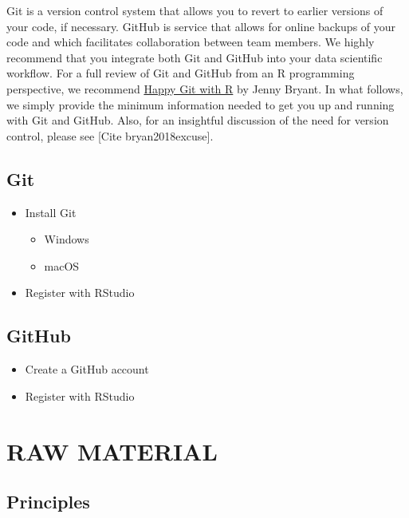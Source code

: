 \documentclass[
]{book}
\providecommand{\tightlist}{%
  \setlength{\itemsep}{0pt}\setlength{\parskip}{0pt}}
\begin{document}
Git is a version control system that allows you to revert to earlier versions of your code, if necessary. GitHub is service that allows for online backups of your code and which facilitates collaboration between team members. We highly recommend that you integrate both Git and GitHub into your data scientific workflow. For a full review of Git and GitHub from an R programming perspective, we recommend \href{https://happygitwithr.com/}{Happy Git with R} by Jenny Bryant. In what follows, we simply provide the minimum information needed to get you up and running with Git and GitHub. Also, for an insightful discussion of the need for version control, please see {[}Cite bryan2018excuse{]}.

\hypertarget{git}{%
\subsection{Git}\label{git}}

\begin{itemize}
\tightlist
\item
  Install Git

  \begin{itemize}
  \tightlist
  \item
    Windows
  \item
    macOS
  \end{itemize}
\item
  Register with RStudio
\end{itemize}

\hypertarget{github}{%
\subsection{GitHub}\label{github}}

\begin{itemize}
\tightlist
\item
  Create a GitHub account
\item
  Register with RStudio
\end{itemize}

\hypertarget{raw-material}{%
\section{RAW MATERIAL}\label{raw-material}}

\hypertarget{principles}{%
\subsection{Principles}\label{principles}}
\end{document}
